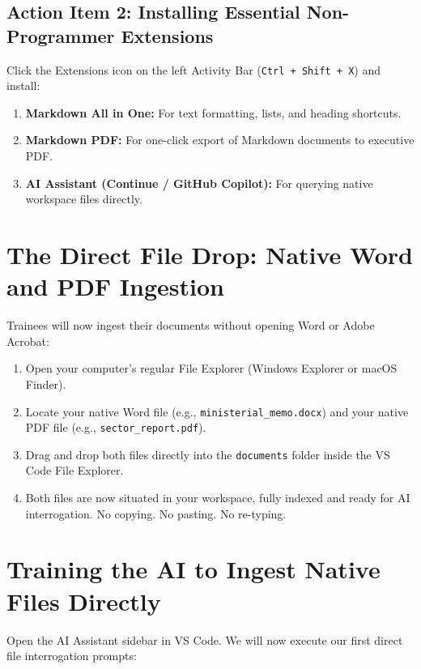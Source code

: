 \documentclass[11pt, a4paper]{report}
\begin{document}
\subsection{Action Item 2: Installing Essential Non-Programmer Extensions}
Click the Extensions icon on the left Activity Bar (\texttt{Ctrl + Shift + X}) and install:
\begin{enumerate}
    \item \textbf{Markdown All in One:} For text formatting, lists, and heading shortcuts.
    \item \textbf{Markdown PDF:} For one-click export of Markdown documents to executive PDF.
    \item \textbf{AI Assistant (Continue / GitHub Copilot):} For querying native workspace files directly.
\end{enumerate}

\section{The Direct File Drop: Native Word and PDF Ingestion}
Trainees will now ingest their documents without opening Word or Adobe Acrobat:
\begin{enumerate}[label=\textbf{Step \arabic*:}]
    \item Open your computer's regular File Explorer (Windows Explorer or macOS Finder).
    \item Locate your native Word file (e.g., \texttt{ministerial\_memo.docx}) and your native PDF file (e.g., \texttt{sector\_report.pdf}).
    \item Drag and drop both files directly into the \texttt{documents} folder inside the VS Code File Explorer.
    \item Both files are now situated in your workspace, fully indexed and ready for AI interrogation. No copying. No pasting. No re-typing.
\end{enumerate}

\section{Training the AI to Ingest Native Files Directly}
Open the AI Assistant sidebar in VS Code. We will now execute our first direct file interrogation prompts:
\end{document}
